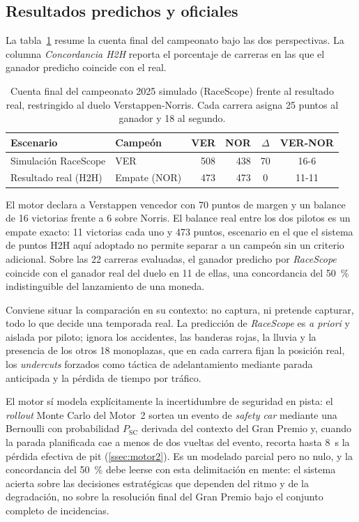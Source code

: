 \subsection{Resultados predichos y oficiales}
\label{ssec:campeonato_resultados}

La tabla~\ref{tab:campeonato_ver_nor} resume la cuenta final del campeonato bajo las dos perspectivas. La columna \textit{Concordancia H2H} reporta el porcentaje de carreras en las que el ganador predicho coincide con el real.

\begin{table}[h]
\centering
\caption{Cuenta final del campeonato 2025 simulado (RaceScope) frente al resultado real, restringido al duelo Verstappen-Norris. Cada carrera asigna 25 puntos al ganador y 18 al segundo.}
\label{tab:campeonato_ver_nor}
\small
\begin{tabularx}{\textwidth}{llrrcc}
\toprule
\textbf{Escenario} & \textbf{Campeón} & \textbf{VER} & \textbf{NOR} & \textbf{$\Delta$} & \textbf{ VER-NOR} \\
\midrule
Simulación RaceScope & VER          & 508 & 438 & 70 & 16-6  \\
Resultado real (H2H) & Empate (NOR) & 473 & 473 & 0  & 11-11 \\
\bottomrule
\end{tabularx}
\end{table}

El motor declara a Verstappen vencedor con 70 puntos de margen y un balance de 16 victorias frente a 6 sobre Norris. El balance real entre los dos pilotos es un empate exacto: 11 victorias cada uno y 473 puntos, escenario en el que el sistema de puntos H2H aquí adoptado no permite separar a un campeón sin un criterio adicional. Sobre las 22 carreras evaluadas, el ganador predicho por \textit{RaceScope} coincide con el ganador real del duelo en 11 de ellas, una concordancia del 50~\% indistinguible del lanzamiento de una moneda.

Conviene situar la comparación en su contexto: no captura, ni pretende capturar, todo lo que decide una temporada real. La predicción de \textit{RaceScope} es \textit{a priori} y aislada por piloto; ignora los accidentes, las banderas rojas, la lluvia y la presencia de los otros 18 monoplazas, que en cada carrera fijan la posición real, los \textit{undercuts} forzados como táctica de adelantamiento mediante parada anticipada \cite{heilmeier2020vse} y la pérdida de tiempo por tráfico. 

El motor sí modela explícitamente la incertidumbre de seguridad en pista: el \textit{rollout} Monte Carlo del Motor~2 sortea un evento de \textit{safety car} mediante una Bernoulli con probabilidad $P_\text{SC}$ derivada del contexto del Gran Premio y, cuando la parada planificada cae a menos de dos vueltas del evento, recorta hasta 8~s la pérdida efectiva de pit (\ref{ssec:motor2}). Es un modelado parcial pero no nulo, y la concordancia del 50~\% debe leerse con esta delimitación en mente: el sistema acierta sobre las decisiones estratégicas que dependen del ritmo y de la degradación, no sobre la resolución final del Gran Premio bajo el conjunto completo de incidencias.

